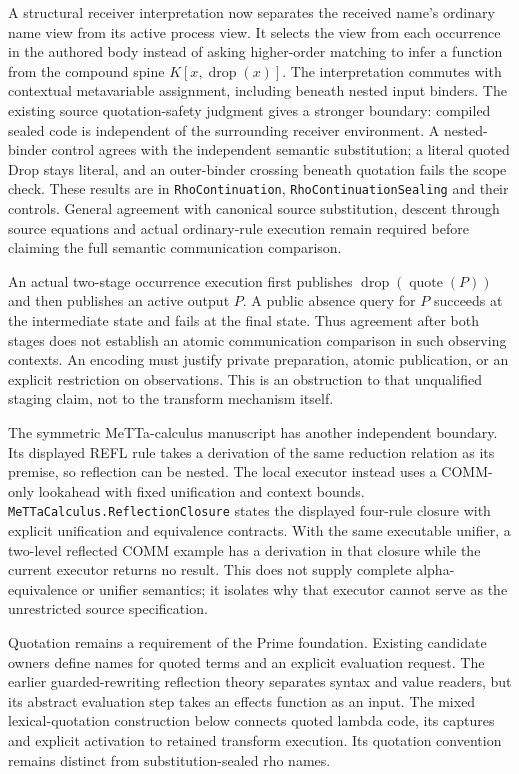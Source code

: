 \documentclass[11pt]{article}
\newcommand{\code}[1]{\texttt{\small #1}}
\begin{document}
A structural receiver interpretation now separates the received name's
ordinary name view from its active process view. It selects the view from
each occurrence in the authored body instead of asking higher-order matching
to infer a function from the compound spine $K[x,\operatorname{drop}(x)]$.
The interpretation commutes with contextual metavariable assignment,
including beneath nested input binders. The existing source quotation-safety
judgment gives a stronger boundary: compiled sealed code is independent of
the surrounding receiver environment. A nested-binder control agrees with
the independent semantic substitution; a literal quoted Drop stays literal,
and an outer-binder crossing beneath quotation fails the scope check.
These results are in \code{RhoContinuation},
\code{RhoContinuationSealing} and their controls. General agreement with
canonical source substitution, descent through source equations and actual
ordinary-rule execution remain required before claiming the full semantic
communication comparison.

An actual two-stage occurrence execution first publishes
$\operatorname{drop}(\operatorname{quote}(P))$ and then publishes an active
output $P$. A public absence query for $P$ succeeds at the intermediate state
and fails at the final state. Thus agreement after both stages does not
establish an atomic communication comparison in such observing contexts.
An encoding must justify private preparation, atomic publication, or an
explicit restriction on observations. This is an obstruction to that
unqualified staging claim, not to the transform mechanism itself.

The symmetric MeTTa-calculus manuscript has another independent boundary.
Its displayed REFL rule takes a derivation of the same reduction relation
as its premise, so reflection can be nested. The local executor instead
uses a COMM-only lookahead with fixed unification and context bounds.
\code{MeTTaCalculus.ReflectionClosure} states the displayed four-rule
closure with explicit unification and equivalence contracts. With the same
executable unifier, a two-level reflected COMM example has a derivation in
that closure while the current executor returns no result. This does not
supply complete alpha-equivalence or unifier semantics; it isolates why
that executor cannot serve as the unrestricted source specification.

Quotation remains a requirement of the Prime foundation. Existing candidate
owners define names for quoted terms and an explicit evaluation request.
The earlier guarded-rewriting reflection theory separates syntax and value
readers, but its abstract evaluation step takes an effects function as an
input. The mixed lexical-quotation construction below connects quoted lambda
code, its captures and explicit activation to retained transform execution.
Its quotation convention remains distinct from substitution-sealed rho names.
\end{document}
